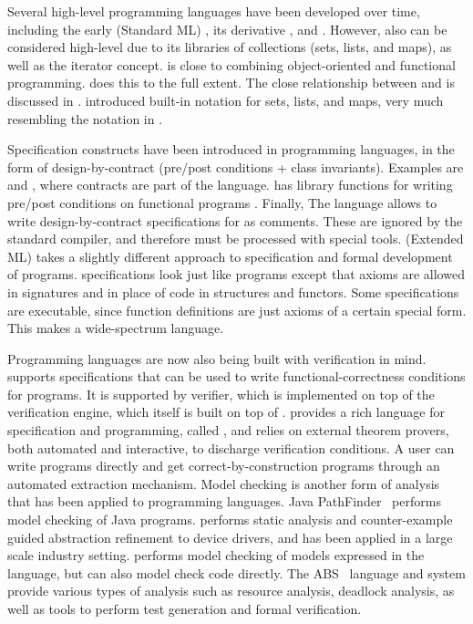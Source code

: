 Several high-level programming languages have been developed over
time, including the early \sml{} (Standard ML) \cite{standard-ml-97},
its derivative \ocaml{} \cite{ocaml}, and \haskell{}
\cite{haskell}. However, also \java{} can be considered high-level due
to its libraries of collections (sets, lists, and maps), as well as
the iterator concept. \python{} \cite{python} is close to combining
object-oriented and functional programming. \scala{} \cite{scala} does
this to the full extent. The close relationship between \scala{} and
\vdm{} is discussed in \cite{havelund-scala-vdm-12}.  \fortress{}
\cite{fortress} introduced built-in notation for sets, lists, and
maps, very much resembling the notation in \vdm{}.

Specification constructs have been introduced in programming
languages, in the form of design-by-contract (pre/post conditions +
class invariants). Examples are \eiffel{} \cite{eiffel} and
\specsharp{} \cite{specsharp}, where contracts are part of the
language. \scala{} has library functions for writing pre/post
conditions on functional programs \cite{odersky-rv10}. Finally, The
\jml{} language \cite{jml} allows to write design-by-contract
specifications for \java{} as comments. These are ignored by the
standard \java{} compiler, and therefore must be processed with
special tools. \eml{} (Extended ML) \cite{sannella-eml-97} takes a
slightly different approach to specification and formal development of
\sml{} programs.  \eml{} specifications look just like \sml{} programs
except that axioms are allowed in signatures and in place of code in
structures and functors. Some \eml{} specifications are executable,
since \sml{} function definitions are just axioms of a certain special
form. This makes \eml{} a wide-spectrum language.

Programming languages are now also being built with verification in
mind.  \dafny{} \cite{leino-lpar-2010} supports specifications that
can be used to write functional-correctness conditions for programs.
It is supported by verifier, which is implemented on top of the
\boogie{} verification engine, which itself is built on top of
\zthree.  \whythree{} \cite{filliatre-why3-2011} provides a rich
language for specification and programming, called \whyml{}, and
relies on external theorem provers, both automated and interactive, to
discharge verification conditions. A user can write \whyml{} programs
directly and get correct-by-construction \ocaml{} programs through an
automated extraction mechanism. Model checking is another form of
analysis that has been applied to programming languages.  Java
PathFinder~\cite{havelund-jpf-00,havelund-visser02} performs model
checking of Java programs. \slam{} \cite{ball2010slam2} performs
static analysis and counter-example guided abstraction refinement to
device drivers, and has been applied in a large scale industry
setting.  \spin{} \cite{holzmann-spin-2004} performs model checking of
models expressed in the \promela{} language, but can also model check
\clang{} code directly. The ABS~\cite{hahnle2012abstract} language and
system provide various types of analysis such as resource analysis,
deadlock analysis, as well as tools to perform test generation and
formal verification.

